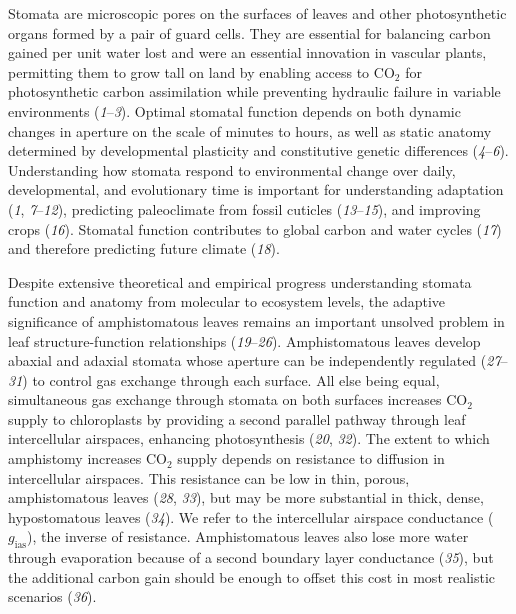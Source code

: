 \documentclass[
  letterpaper,
  DIV=11,
  numbers=noendperiod]{scrartcl}
\newcommand{\gias}{$g_\text{ias}$}
\begin{document}
Stomata are microscopic pores on the surfaces of leaves and other
photosynthetic organs formed by a pair of guard cells. They are
essential for balancing carbon gained per unit water lost and were an
essential innovation in vascular plants, permitting them to grow tall on
land by enabling access to CO\(_2\) for photosynthetic carbon
assimilation while preventing hydraulic failure in variable environments
(\emph{1}--\emph{3}). Optimal stomatal function depends on both dynamic
changes in aperture on the scale of minutes to hours, as well as static
anatomy determined by developmental plasticity and constitutive genetic
differences (\emph{4}--\emph{6}). Understanding how stomata respond to
environmental change over daily, developmental, and evolutionary time is
important for understanding adaptation (\emph{1}, \emph{7}--\emph{12}),
predicting paleoclimate from fossil cuticles (\emph{13}--\emph{15}), and
improving crops (\emph{16}). Stomatal function contributes to global
carbon and water cycles (\emph{17}) and therefore predicting future
climate (\emph{18}).

Despite extensive theoretical and empirical progress understanding
stomata function and anatomy from molecular to ecosystem levels, the
adaptive significance of amphistomatous leaves remains an important
unsolved problem in leaf structure-function relationships
(\emph{19}--\emph{26}). Amphistomatous leaves develop abaxial and
adaxial stomata whose aperture can be independently regulated
(\emph{27}--\emph{31}) to control gas exchange through each surface. All
else being equal, simultaneous gas exchange through stomata on both
surfaces increases CO\(_2\) supply to chloroplasts by providing a second
parallel pathway through leaf intercellular airspaces, enhancing
photosynthesis (\emph{20}, \emph{32}). The extent to which amphistomy
increases CO\(_2\) supply depends on resistance to diffusion in
intercellular airspaces. This resistance can be low in thin, porous,
amphistomatous leaves (\emph{28}, \emph{33}), but may be more
substantial in thick, dense, hypostomatous leaves (\emph{34}). We refer
to the intercellular airspace conductance (\gias), the inverse of
resistance. Amphistomatous leaves also lose more water through
evaporation because of a second boundary layer conductance (\emph{35}),
but the additional carbon gain should be enough to offset this cost in
most realistic scenarios (\emph{36}).
\end{document}
